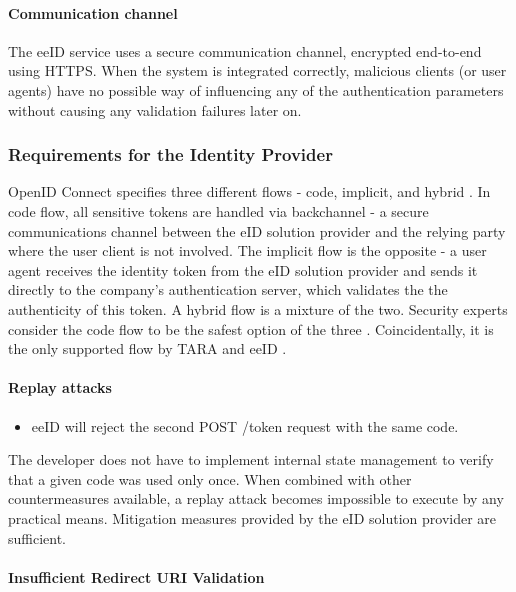 \paragraph{Communication channel}

The eeID service uses a secure communication channel, encrypted end-to-end using HTTPS. When the system is integrated correctly, malicious clients (or user agents) have no possible way of influencing any of the authentication parameters without causing any validation failures later on.

\subsubsection{Requirements for the Identity Provider}

OpenID Connect specifies three different flows - code, implicit, and hybrid \cite{oidc}. In code flow, all sensitive tokens are handled via backchannel - a secure communications channel between the eID solution provider and the relying party where the user client is not involved. The implicit flow is the opposite - a user agent receives the identity token from the eID solution provider and sends it directly to the company's authentication server, which validates the the authenticity of this token. A hybrid flow is a mixture of the two. Security experts consider the code flow to be the safest option of the three \cite{ietf-oauth-security-topics-19}. Coincidentally, it is the only supported flow by TARA and eeID \cite{tara-technical}.

\paragraph{Replay attacks}

\begin{itemize}
  \item eeID will reject the second POST /token request with the same code.
\end{itemize}

The developer does not have to implement internal state management to verify that a given code was used only once. When combined with other countermeasures available, a replay attack becomes impossible to execute by any practical means. Mitigation measures provided by the eID solution provider are sufficient.

\paragraph{Insufficient Redirect URI Validation}

